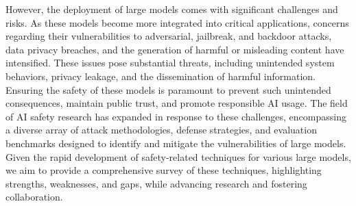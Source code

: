 
However, the deployment of large models comes with significant challenges and risks. 
As these models become more integrated into critical applications, concerns regarding their vulnerabilities to adversarial, jailbreak, and backdoor attacks, data privacy breaches, and the generation of harmful or misleading content have intensified. 
These issues pose substantial threats, including unintended system behaviors, privacy leakage, and the dissemination of harmful information. Ensuring the safety of these models is paramount to prevent such unintended consequences, maintain public trust, and promote responsible AI usage.
The field of AI safety research has expanded in response to these challenges, encompassing a diverse array of attack methodologies, defense strategies, and evaluation benchmarks designed to identify and mitigate the vulnerabilities of large models. 
Given the rapid development of safety-related techniques for various large models, we aim to provide a comprehensive survey of these techniques, highlighting strengths, weaknesses, and gaps, while advancing research and fostering collaboration.


